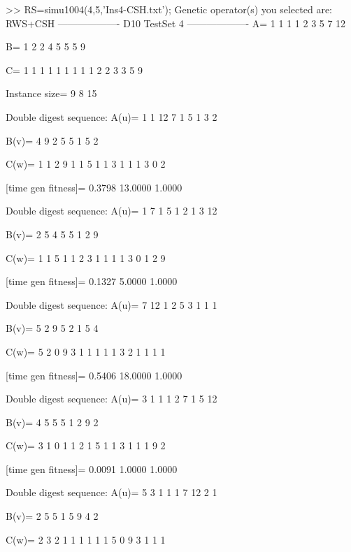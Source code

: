 >> RS=simu1004(4,5,'Ins4-CSH.txt');
Genetic operator(s) you selected are:
RWS+CSH
------------------- D10 TestSet 4 -------------------
A=
     1     1     1     1     2     3     5     7    12

B=
     1     2     2     4     5     5     5     9

C=
     1     1     1     1     1     1     1     1     1     2     2     3     3     5     9

Instance size=
     9     8    15

Double digest sequence:
A(u)=
     1     1    12     7     1     5     1     3     2

B(v)=
     4     9     2     5     5     1     5     2

C(w)=
     1     1     2     9     1     1     5     1     1     3     1     1     1     3     0     2

[time gen fitness]=
    0.3798   13.0000    1.0000

Double digest sequence:
A(u)=
     1     7     1     5     1     2     1     3    12

B(v)=
     2     5     4     5     5     1     2     9

C(w)=
     1     1     5     1     1     2     3     1     1     1     1     3     0     1     2     9

[time gen fitness]=
    0.1327    5.0000    1.0000

Double digest sequence:
A(u)=
     7    12     1     2     5     3     1     1     1

B(v)=
     5     2     9     5     2     1     5     4

C(w)=
     5     2     0     9     3     1     1     1     1     1     3     2     1     1     1     1

[time gen fitness]=
    0.5406   18.0000    1.0000

Double digest sequence:
A(u)=
     3     1     1     1     2     7     1     5    12

B(v)=
     4     5     5     5     1     2     9     2

C(w)=
     3     1     0     1     1     2     1     5     1     1     3     1     1     1     9     2

[time gen fitness]=
    0.0091    1.0000    1.0000

Double digest sequence:
A(u)=
     5     3     1     1     1     7    12     2     1

B(v)=
     2     5     5     1     5     9     4     2

C(w)=
     2     3     2     1     1     1     1     1     1     5     0     9     3     1     1     1

